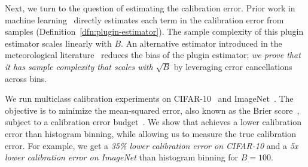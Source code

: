 Next, we turn to the question of estimating the calibration error. Prior work in machine learning~\cite{nguyen2015posterior, guo2017calibration, hendrycks2019anomaly, kuleshov2015calibrated, hendrycks2019pretraining} directly estimates each term  in the calibration error from samples (Definition~\ref{dfn:plugin-estimator}). The sample complexity of this plugin estimator scales linearly with $B$. An alternative estimator introduced in the meteorological literature~\cite{brocker2012empirical, ferro2012bias} reduces the bias of the plugin estimator; \emph{we prove that it has sample complexity that scales with $\sqrt{B}$} by leveraging error cancellations across bins.

We run multiclass calibration experiments on CIFAR-10~\cite{krizhevsky2009learningmultiple} and ImageNet~\cite{deng2009imagenet}.
The objective is to minimize the mean-squared error, also known as the Brier score~\cite{brier1950verification}, subject to a calibration error budget~\cite{gneiting2005weather}.
We show that \ourcal{} achieves a lower calibration error than histogram binning, while allowing us to measure the true calibration error.
For example, we get a \emph{35\% lower calibration error on CIFAR-10} and a \emph{5x lower calibration error on ImageNet} than histogram binning for $B = 100$.




